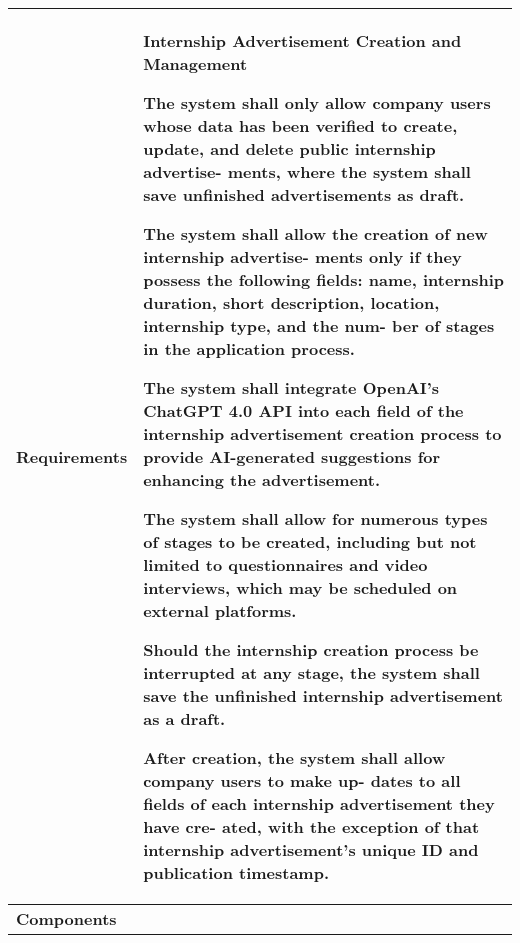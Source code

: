 \begin{table}[h]
    \centering
    \renewcommand{\arraystretch}{1.5} %
    \begin{tabular}{|C{0.3\textwidth}|L{0.65\textwidth}|} %
        \hline
        \textbf{Requirements} & 
        \textbf{Internship Advertisement Creation and Management} \par
        [FR20] The system shall only allow company users whose data has been
        verified to create, update, and delete public internship advertise-
        ments, where the system shall save unfinished advertisements as
        draft. \par
        [FR21] The system shall allow the creation of new internship advertise-
        ments only if they possess the following fields: name, internship
        duration, short description, location, internship type, and the num-
        ber of stages in the application process. \par
        [FR22] The system shall integrate OpenAI’s ChatGPT 4.0 API into each
        field of the internship advertisement creation process to provide
        AI-generated suggestions for enhancing the advertisement. \par
        [FR23] The system shall allow for numerous types of stages to be created,
        including but not limited to questionnaires and video interviews,
        which may be scheduled on external platforms. \par
        [FR24] Should the internship creation process be interrupted at any stage,
        the system shall save the unfinished internship advertisement as a
        draft. \par
        [FR25] After creation, the system shall allow company users to make up-
        dates to all fields of each internship advertisement they have cre-
        ated, with the exception of that internship advertisement’s unique
        ID and publication timestamp. \\
        \hline
        \textbf{Components} & 
        \\
        \hline
    \end{tabular}
\end{table}


